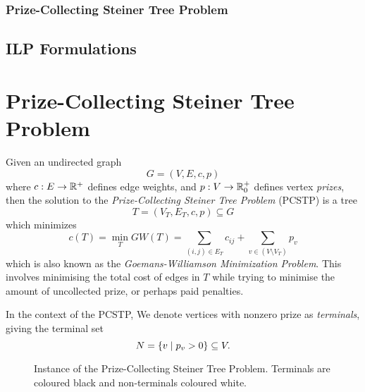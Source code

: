 \subsubsection{Prize-Collecting Steiner Tree Problem}

\subsection{ILP Formulations}
\section{Prize-Collecting Steiner Tree Problem}
Given an undirected graph
$$G = (V, E, c, p)$$
where $c: E \to \mathbb{R}^+$ defines edge weights,
and $p: V \to \mathbb{R}_0^+$ defines vertex \textit{prizes}, then the solution to the \textit{Prize-Collecting
  Steiner Tree Problem} (PCSTP) is a tree
$$T = (V_T, E_T, c, p) \subseteq G$$
which minimizes
$$c(T) = \min_T GW(T) = \sum_{(i,j) \in E_T} c_{ij} + \sum_{v\in (V \setminus V_T)} p_v$$
which is also known as the {\textit{Goemans-Williamson Minimization Problem}}. This involves minimising
 the total cost of edges in $T$ while trying to minimise the amount of uncollected prize, or perhaps paid penalties.

In the context of the PCSTP, We denote vertices with nonzero prize as \textit{terminals}, giving the terminal set
$$N = \{v \mid p_v > 0\} \subseteq V\mathnormal{.}$$

\begin{figure}[h]\centering
{}
\caption{Instance of the Prize-Collecting Steiner Tree Problem. Terminals are coloured black and non-terminals coloured white.}
\label{fig:pcstp:01}
\end{figure}

